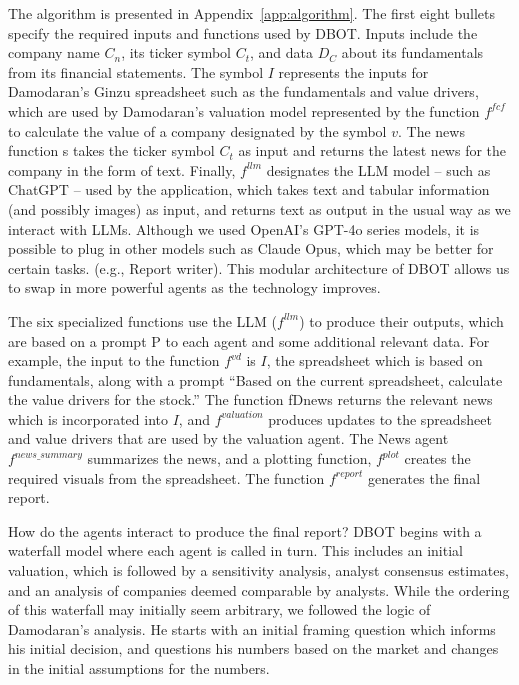 \documentclass[]{interact}
\theoremstyle{plain}%
\theoremstyle{definition}
\theoremstyle{remark}
\begin{document}
The algorithm is presented in Appendix~\ref{app:algorithm}. The first eight bullets specify the required inputs and functions used by DBOT. Inputs include the company name $C_n$, its ticker symbol $C_t$, and data $D_C$ about its fundamentals from its financial statements. The symbol $I$ represents the inputs for Damodaran's Ginzu spreadsheet such as the fundamentals and value drivers, which are used by Damodaran’s valuation model represented by the function $f^{fcf}$ to calculate the value of a company designated by the symbol $v$.  The news function s takes the ticker symbol $C_t$ as input and returns the latest news for the company in the form of text. Finally, $f^{llm}$ designates the LLM model – such as ChatGPT – used by the application, which takes text and tabular information (and possibly images) as input, and returns text as output in the usual way as we interact with LLMs. Although we used OpenAI’s GPT-4o series models, it is possible to plug in other models such as Claude Opus, which may be better for certain tasks. (e.g., Report writer). This modular architecture of DBOT allows us to swap in more powerful agents as the technology improves. 

The six specialized functions use the LLM ($f^{llm}$) to produce their outputs, which are based on a prompt P to each agent and some additional relevant data. For example, the input to the function $f^{vd}$ is $I$, the spreadsheet which is based on fundamentals, along with a prompt “Based on the current spreadsheet, calculate the value drivers for the stock.” The function fDnews returns the relevant news which is incorporated into $I$, and  $f^{valuation}$ produces updates to the spreadsheet and value drivers that are used by the valuation agent. The News agent $f^{news\_summary}$  summarizes the news, and a plotting function, $f^{plot}$ creates the required visuals from the spreadsheet. The function $f^{report}$ generates the final report.

How do the agents interact to produce the final report? DBOT begins with a waterfall model where each agent is called in turn. This includes an initial valuation, which is followed by a sensitivity analysis, analyst consensus estimates, and an analysis of companies deemed comparable by analysts. While the ordering of this waterfall may initially seem arbitrary, we followed the logic of Damodaran’s analysis. He starts with an initial framing question which informs his initial decision, and questions his numbers based on the market and changes in the initial assumptions for the numbers. 
\end{document}
